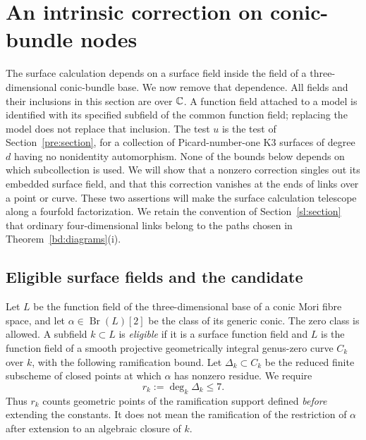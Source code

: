 \section{An intrinsic correction on conic-bundle nodes}\label{sf:section}

The surface calculation depends on a surface field inside the field of a
three-dimensional conic-bundle base.  We now remove that dependence.  All
fields and their inclusions in this section are over $\mathbb C$.  A function field
attached to a model is identified with its specified subfield of the common
function field; replacing the model does not replace that inclusion.
The test $u$ is the test of Section~\ref{pre:section}, for a collection of
Picard-number-one K3 surfaces of degree $d$ having no nonidentity
automorphism.  None of the bounds below depends on which subcollection is
used.  We will show that a nonzero correction singles out its embedded
surface field, and that this correction vanishes at the ends of links
over a point or curve.  These two assertions will make the surface
calculation telescope along a fourfold factorization.
We retain the convention of Section~\ref{sl:section} that ordinary
four-dimensional links belong to the paths chosen in
Theorem~\ref{bd:diagrams}\textup{(i)}.

\subsection{Eligible surface fields and the candidate}

Let $L$ be the function field of the three-dimensional base of a conic
Mori fibre space, and let $\alpha\in\operatorname{Br}(L)[2]$ be the
class of its generic conic.  The zero class is allowed.  A subfield
$k\subset L$ is \emph{eligible} if it is a surface function field and
$L$ is the function field of a smooth projective geometrically integral
genus-zero curve $C_k$ over $k$, with the following ramification bound.
Let $\Delta_k\subset C_k$ be the reduced finite subscheme of closed points
at which $\alpha$ has nonzero residue.  We require
\begin{equation}\label{sf:eligibility}
 r_k:=\deg_k\Delta_k\leq 7.
\end{equation}
Thus $r_k$ counts geometric points of the ramification support defined
\emph{before} extending the constants.  It does not mean the ramification
of the restriction of $\alpha$ after extension to an algebraic closure
of $k$.


